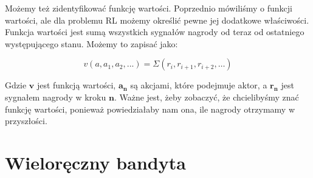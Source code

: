 \noindent Możemy też zidentyfikować funkcję wartości. Poprzednio mówiliśmy o funkcji wartości, ale dla problemu RL możemy określić pewne jej dodatkowe właściwości. Funkcja wartości jest sumą wszystkich sygnałów nagrody od teraz od ostatniego występującego stanu. Możemy to zapisać jako:

\begin{equation}
v(a, a_1, a_2, ...) = \Sigma(r_i, r_{i+1}, r_{i+2}, …)
\end{equation}

\noindent Gdzie $\boldsymbol{v}$ jest funkcją wartości, $\boldsymbol{a_n}$ są akcjami, które podejmuje aktor, a $\boldsymbol{r_n}$ jest sygnałem nagrody w kroku $\boldsymbol{n}$. Ważne jest, żeby zobaczyć, że chcielibyśmy znać funkcję wartości, ponieważ powiedziałaby nam ona, ile nagrody otrzymamy w przyszłości.


\section{Wieloręczny bandyta}

